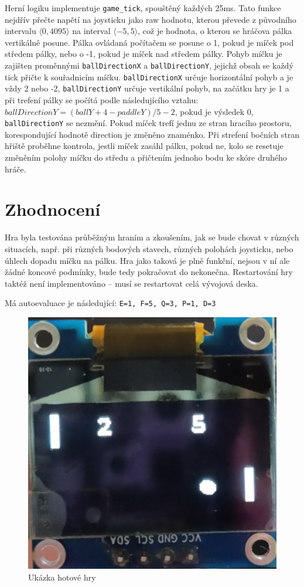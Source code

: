 \documentclass[a4paper, 11pt]{article}
\begin{document}
Herní logiku implementuje \texttt{game\_tick}, spouštěný každých 25ms.
Tato funkce nejdřív přečte napětí na joysticku jako raw hodnotu, kterou převede z původního intervalu $\langle0, 4095\rangle$ na interval $\langle-5, 5\rangle$, což je hodnota, o kterou se hráčova pálka vertikálně posune.
Pálka ovládaná počítačem se posune o 1, pokud je míček pod středem pálky, nebo o -1, pokud je míček nad středem pálky.
Pohyb míčku je zajišten proměnnými \texttt{ballDirectionX} a \texttt{ballDirectionY}, jejichž obsah se každý tick přičte k souřadnicím míčku.
\texttt{ballDirectionX} určuje horizontální pohyb a je vždy 2 nebo -2, \texttt{ballDirectionY} určuje vertikální pohyb, na začátku hry je 1 a při trefení pálky se počítá podle následujícího vztahu: $ballDirectionY = (ballY + 4 - paddleY) / 5 - 2$, pokud je výsledek 0, \texttt{ballDirectionY} se nezmění.
Pokud míček trefí jednu ze stran hracího prostoru, korespondující hodnotě direction je změněno znaménko.
Při strefení bočních stran hřiště proběhne kontrola, jestli míček zasáhl pálku, pokud ne, kolo se resetuje změněním polohy míčku do středu a přičtením jednoho bodu ke skóre druhého hráče.

\section{Zhodnocení}
Hra byla testována průběžným hraním a zkoušením, jak se bude chovat v různých situacích, např. při různých bodových stavech, různých polohách joysticku, nebo úhlech dopadu míčku na pálku.
Hra jako taková je plně funkční, nejsou v ní ale žádné koncové podmínky, bude tedy pokračovat do nekonečna.
Restartování hry taktéž není implementováno -- musí se restartovat celá vývojová deska.

Má autoevaluace je následující: \texttt{E=1, F=5, Q=3, P=1, D=3}

\begin{figure}[ht]
    \centering
    \includegraphics[width=0.7 \linewidth]{inc/img.jpg}
    \caption{Ukázka hotové hry}
\end{figure}
\end{document}
